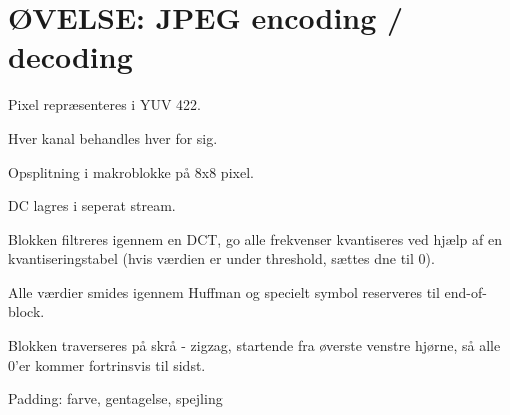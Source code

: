 \newpage
\section{ØVELSE: JPEG encoding / decoding}
\textit{}
Pixel repræsenteres i YUV 422.

Hver kanal behandles hver for sig.

Opsplitning i makroblokke på 8x8 pixel.

DC lagres i seperat stream.

Blokken filtreres igennem en DCT, go alle frekvenser kvantiseres ved
hjælp af en kvantiseringstabel (hvis værdien er under threshold,
sættes dne til 0).

Alle værdier smides igennem Huffman og specielt symbol reserveres til
end-of-block.

Blokken traverseres på skrå - zigzag, startende fra øverste venstre
hjørne, så alle 0'er kommer fortrinsvis til sidst.

Padding: farve, gentagelse, spejling
